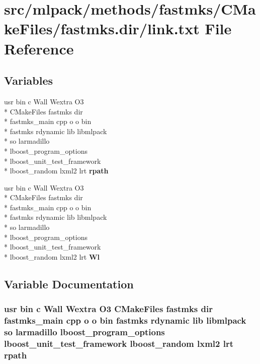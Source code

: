 \section{src/mlpack/methods/fastmks/\-C\-Make\-Files/fastmks.dir/link.txt File Reference}
\label{methods_2fastmks_2CMakeFiles_2fastmks_8dir_2link_8txt}
\subsection*{Variables}
\begin{DoxyCompactItemize}
\item 
usr bin c Wall Wextra O3 \\*
C\-Make\-Files fastmks dir \\*
fastmks\-\_\-main cpp o o bin \\*
fastmks rdynamic lib libmlpack \\*
so larmadillo \\*
lboost\-\_\-program\-\_\-options \\*
lboost\-\_\-unit\-\_\-test\-\_\-framework \\*
lboost\-\_\-random lxml2 lrt {\bf rpath}
\item 
usr bin c Wall Wextra O3 \\*
C\-Make\-Files fastmks dir \\*
fastmks\-\_\-main cpp o o bin \\*
fastmks rdynamic lib libmlpack \\*
so larmadillo \\*
lboost\-\_\-program\-\_\-options \\*
lboost\-\_\-unit\-\_\-test\-\_\-framework \\*
lboost\-\_\-random lxml2 lrt {\bf Wl}
\end{DoxyCompactItemize}


\subsection{Variable Documentation}
\subsubsection[{rpath}]{\setlength{\rightskip}{0pt plus 5cm}usr bin c Wall Wextra O3 C\-Make\-Files fastmks dir fastmks\-\_\-main cpp o o bin fastmks rdynamic lib libmlpack so larmadillo lboost\-\_\-program\-\_\-options lboost\-\_\-unit\-\_\-test\-\_\-framework lboost\-\_\-random lxml2 lrt rpath}\label{methods_2fastmks_2CMakeFiles_2fastmks_8dir_2link_8txt_a177262baaf74b0f90610f0070f3da6d8}


